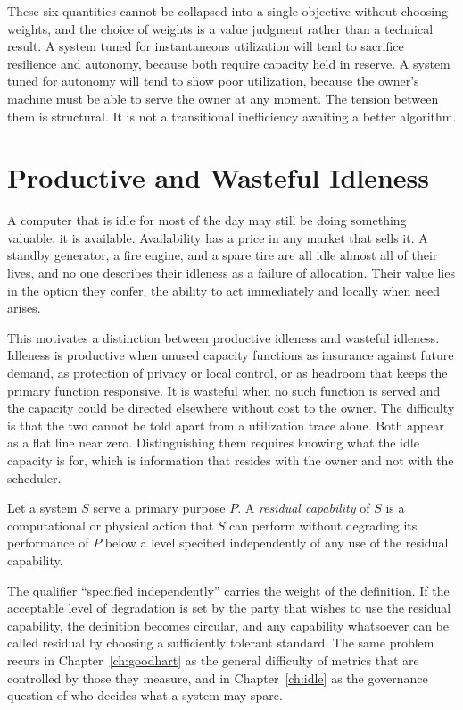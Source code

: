 These six quantities cannot be collapsed into a single objective without choosing weights, and the choice of weights is a value judgment rather than a technical result. A system tuned for instantaneous utilization will tend to sacrifice resilience and autonomy, because both require capacity held in reserve. A system tuned for autonomy will tend to show poor utilization, because the owner's machine must be able to serve the owner at any moment. The tension between them is structural. It is not a transitional inefficiency awaiting a better algorithm.

\section{Productive and Wasteful Idleness}

A computer that is idle for most of the day may still be doing something valuable: it is available. Availability has a price in any market that sells it. A standby generator, a fire engine, and a spare tire are all idle almost all of their lives, and no one describes their idleness as a failure of allocation. Their value lies in the option they confer, the ability to act immediately and locally when need arises.

This motivates a distinction between productive idleness and wasteful idleness. Idleness is productive when unused capacity functions as insurance against future demand, as protection of privacy or local control, or as headroom that keeps the primary function responsive. It is wasteful when no such function is served and the capacity could be directed elsewhere without cost to the owner. The difficulty is that the two cannot be told apart from a utilization trace alone. Both appear as a flat line near zero. Distinguishing them requires knowing what the idle capacity is for, which is information that resides with the owner and not with the scheduler.

\begin{definition}
\label{def:residual}
Let a system $S$ serve a primary purpose $P$. A \emph{residual capability} of $S$ is a computational or physical action that $S$ can perform without degrading its performance of $P$ below a level specified independently of any use of the residual capability.
\end{definition}

The qualifier ``specified independently'' carries the weight of the definition. If the acceptable level of degradation is set by the party that wishes to use the residual capability, the definition becomes circular, and any capability whatsoever can be called residual by choosing a sufficiently tolerant standard. The same problem recurs in Chapter~\ref{ch:goodhart} as the general difficulty of metrics that are controlled by those they measure, and in Chapter~\ref{ch:idle} as the governance question of who decides what a system may spare.

